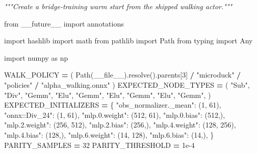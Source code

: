 \documentclass[
  chinese,
  11pt,
  letterpaper,
]{article}
\newenvironment{Shaded}{\begin{snugshade}}{\end{snugshade}}
\newcommand{\CommentTok}[1]{\textcolor[rgb]{0.56,0.35,0.01}{\textit{#1}}}
\newcommand{\DecValTok}[1]{\textcolor[rgb]{0.00,0.00,0.81}{#1}}
\newcommand{\FloatTok}[1]{\textcolor[rgb]{0.00,0.00,0.81}{#1}}
\newcommand{\ImportTok}[1]{#1}
\newcommand{\NormalTok}[1]{#1}
\newcommand{\OperatorTok}[1]{\textcolor[rgb]{0.81,0.36,0.00}{\textbf{#1}}}
\newcommand{\StringTok}[1]{\textcolor[rgb]{0.31,0.60,0.02}{#1}}
\newcommand{\VariableTok}[1]{\textcolor[rgb]{0.00,0.00,0.00}{#1}}
\renewenvironment{Shaded}{\par\smallskip}{\par\smallskip}
\begin{document}
\begin{Shaded}
\begin{Highlighting}[]
\CommentTok{"""Create a bridge{-}training warm start from the shipped walking actor."""}

\ImportTok{from}\NormalTok{ \_\_future\_\_ }\ImportTok{import}\NormalTok{ annotations}

\ImportTok{import}\NormalTok{ hashlib}
\ImportTok{import}\NormalTok{ math}
\ImportTok{from}\NormalTok{ pathlib }\ImportTok{import}\NormalTok{ Path}
\ImportTok{from}\NormalTok{ typing }\ImportTok{import}\NormalTok{ Any}

\ImportTok{import}\NormalTok{ numpy }\ImportTok{as}\NormalTok{ np}


\NormalTok{WALK\_POLICY }\OperatorTok{=}\NormalTok{ (}
\NormalTok{    Path(}\VariableTok{\_\_file\_\_}\NormalTok{).resolve().parents[}\DecValTok{3}\NormalTok{] }\OperatorTok{/} \StringTok{"microduck"} \OperatorTok{/} \StringTok{"policies"} \OperatorTok{/} \StringTok{"alpha\_walking.onnx"}
\NormalTok{)}
\NormalTok{EXPECTED\_NODE\_TYPES }\OperatorTok{=}\NormalTok{ (}
    \StringTok{"Sub"}\NormalTok{,}
    \StringTok{"Div"}\NormalTok{,}
    \StringTok{"Gemm"}\NormalTok{,}
    \StringTok{"Elu"}\NormalTok{,}
    \StringTok{"Gemm"}\NormalTok{,}
    \StringTok{"Elu"}\NormalTok{,}
    \StringTok{"Gemm"}\NormalTok{,}
    \StringTok{"Elu"}\NormalTok{,}
    \StringTok{"Gemm"}\NormalTok{,}
\NormalTok{)}
\NormalTok{EXPECTED\_INITIALIZERS }\OperatorTok{=}\NormalTok{ \{}
    \StringTok{"obs\_normalizer.\_mean"}\NormalTok{: (}\DecValTok{1}\NormalTok{, }\DecValTok{61}\NormalTok{),}
    \StringTok{"onnx::Div\_24"}\NormalTok{: (}\DecValTok{1}\NormalTok{, }\DecValTok{61}\NormalTok{),}
    \StringTok{"mlp.0.weight"}\NormalTok{: (}\DecValTok{512}\NormalTok{, }\DecValTok{61}\NormalTok{),}
    \StringTok{"mlp.0.bias"}\NormalTok{: (}\DecValTok{512}\NormalTok{,),}
    \StringTok{"mlp.2.weight"}\NormalTok{: (}\DecValTok{256}\NormalTok{, }\DecValTok{512}\NormalTok{),}
    \StringTok{"mlp.2.bias"}\NormalTok{: (}\DecValTok{256}\NormalTok{,),}
    \StringTok{"mlp.4.weight"}\NormalTok{: (}\DecValTok{128}\NormalTok{, }\DecValTok{256}\NormalTok{),}
    \StringTok{"mlp.4.bias"}\NormalTok{: (}\DecValTok{128}\NormalTok{,),}
    \StringTok{"mlp.6.weight"}\NormalTok{: (}\DecValTok{14}\NormalTok{, }\DecValTok{128}\NormalTok{),}
    \StringTok{"mlp.6.bias"}\NormalTok{: (}\DecValTok{14}\NormalTok{,),}
\NormalTok{\}}
\NormalTok{PARITY\_SAMPLES }\OperatorTok{=} \DecValTok{32}
\NormalTok{PARITY\_THRESHOLD }\OperatorTok{=} \FloatTok{1e{-}4}



\end{Highlighting}
\end{Shaded}
\end{document}
